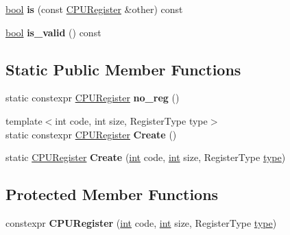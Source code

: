\begin{DoxyCompactItemize}
\item 
\mbox{\label{classv8_1_1internal_1_1CPURegister_adf043b90c8f28af425537071c1d1f159}} 
\mbox{\hyperlink{classbool}{bool}} {\bfseries is} (const \mbox{\hyperlink{classv8_1_1internal_1_1CPURegister}{C\+P\+U\+Register}} \&other) const
\item 
\mbox{\label{classv8_1_1internal_1_1CPURegister_a7496926548b1f85c404f7fd0ec4b315a}} 
\mbox{\hyperlink{classbool}{bool}} {\bfseries is\+\_\+valid} () const
\end{DoxyCompactItemize}
\subsection*{Static Public Member Functions}
\begin{DoxyCompactItemize}
\item 
\mbox{\label{classv8_1_1internal_1_1CPURegister_abdbcafcd8efc094796f2759098924231}} 
static constexpr \mbox{\hyperlink{classv8_1_1internal_1_1CPURegister}{C\+P\+U\+Register}} {\bfseries no\+\_\+reg} ()
\item 
\mbox{\label{classv8_1_1internal_1_1CPURegister_a1dff6c68af758c7934f42dd9f7d308d2}} 
{\footnotesize template$<$int code, int size, Register\+Type type$>$ }\\static constexpr \mbox{\hyperlink{classv8_1_1internal_1_1CPURegister}{C\+P\+U\+Register}} {\bfseries Create} ()
\item 
\mbox{\label{classv8_1_1internal_1_1CPURegister_a543322a341f048618e140b9c6ab8a602}} 
static \mbox{\hyperlink{classv8_1_1internal_1_1CPURegister}{C\+P\+U\+Register}} {\bfseries Create} (\mbox{\hyperlink{classint}{int}} code, \mbox{\hyperlink{classint}{int}} size, Register\+Type \mbox{\hyperlink{classstd_1_1conditional_1_1type}{type}})
\end{DoxyCompactItemize}
\subsection*{Protected Member Functions}
\begin{DoxyCompactItemize}
\item 
\mbox{\label{classv8_1_1internal_1_1CPURegister_a831f231f5dbde6008b45c46437204977}} 
constexpr {\bfseries C\+P\+U\+Register} (\mbox{\hyperlink{classint}{int}} code, \mbox{\hyperlink{classint}{int}} size, Register\+Type \mbox{\hyperlink{classstd_1_1conditional_1_1type}{type}})
\end{DoxyCompactItemize}
